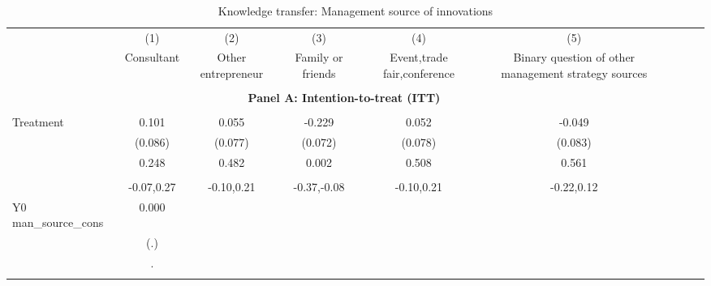 \begin{table}[!h] \centering \\ \caption{Knowledge transfer: Management source of innovations} \\ \begin{adjustbox}{width=\columnwidth,center} \\ \begin{tabular}{l*{8}{c}} \hline\hline
                    &\multicolumn{1}{c}{(1)}         &\multicolumn{1}{c}{(2)}         &\multicolumn{1}{c}{(3)}         &\multicolumn{1}{c}{(4)}         &\multicolumn{1}{c}{(5)}         \\
                    &  Consultant         &Other entrepreneur         &Family or friends         &Event,trade fair,conference         &Binary question of other management strategy sources         \\
\hline \\ \multicolumn{7}{c}{\textbf{Panel A: Intention-to-treat (ITT)}} \\\\[-1ex]
Treatment           &       0.101         &       0.055         &      -0.229\sym{***}&       0.052         &      -0.049         \\
                    &     (0.086)         &     (0.077)         &     (0.072)         &     (0.078)         &     (0.083)         \\
                    &       0.248         &       0.482         &       0.002         &       0.508         &       0.561         \\
                    &                     &                     &                     &                     &                     \\
                    &  -0.07,0.27         &  -0.10,0.21         & -0.37,-0.08         &  -0.10,0.21         &  -0.22,0.12         \\
Y0 man\_source\_cons &       0.000         &                     &                     &                     &                     \\
                    &         (.)         &                     &                     &                     &                     \\
                    &           .         &                     &                     &                     &                     \\
                    &                     &                     &                     &                     &                     \\

\end{tabular}
\end{adjustbox}
\end{table}
